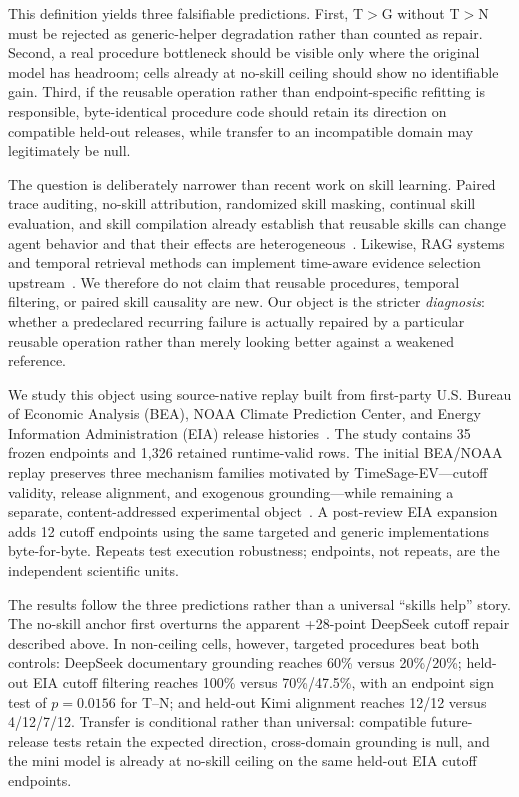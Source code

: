 This definition yields three falsifiable predictions. First, T$>$G without T$>$N must be rejected as generic-helper degradation rather than counted as repair. Second, a real procedure bottleneck should be visible only where the original model has headroom; cells already at no-skill ceiling should show no identifiable gain. Third, if the reusable operation rather than endpoint-specific refitting is responsible, byte-identical procedure code should retain its direction on compatible held-out releases, while transfer to an incompatible domain may legitimately be null.

The question is deliberately narrower than recent work on skill learning. Paired trace auditing, no-skill attribution, randomized skill masking, continual skill evaluation, and skill compilation already establish that reusable skills can change agent behavior and that their effects are heterogeneous~\citep{zhou2026counterfactual,dong2026agentskills,wang2026notallskills,guan2026continualskillbench,wei2026evoharness,zheng2026skillprox,xu2026hyperskill}. Likewise, RAG systems and temporal retrieval methods can implement time-aware evidence selection upstream~\citep{asai2024selfrag,yan2024crag,han2025temporalgraphs,wang2026iarag}. We therefore do not claim that reusable procedures, temporal filtering, or paired skill causality are new. Our object is the stricter \emph{diagnosis}: whether a predeclared recurring failure is actually repaired by a particular reusable operation rather than merely looking better against a weakened reference.

We study this object using source-native replay built from first-party U.S. Bureau of Economic Analysis (BEA), NOAA Climate Prediction Center, and Energy Information Administration (EIA) release histories~\citep{bea2026archive,noaa2026enso,eia2026wpsrarchive}. The study contains 35 frozen endpoints and 1,326 retained runtime-valid rows. The initial BEA/NOAA replay preserves three mechanism families motivated by TimeSage-EV---cutoff validity, release alignment, and exogenous grounding---while remaining a separate, content-addressed experimental object~\citep{yao2026timesage}. A post-review EIA expansion adds 12 cutoff endpoints using the same targeted and generic implementations byte-for-byte. Repeats test execution robustness; endpoints, not repeats, are the independent scientific units.

The results follow the three predictions rather than a universal ``skills help'' story. The no-skill anchor first overturns the apparent +28-point DeepSeek cutoff repair described above. In non-ceiling cells, however, targeted procedures beat both controls: DeepSeek documentary grounding reaches 60\% versus 20\%/20\%; held-out EIA cutoff filtering reaches 100\% versus 70\%/47.5\%, with an endpoint sign test of $p=0.0156$ for T--N; and held-out Kimi alignment reaches 12/12 versus 4/12/7/12. Transfer is conditional rather than universal: compatible future-release tests retain the expected direction, cross-domain grounding is null, and the mini model is already at no-skill ceiling on the same held-out EIA cutoff endpoints.

